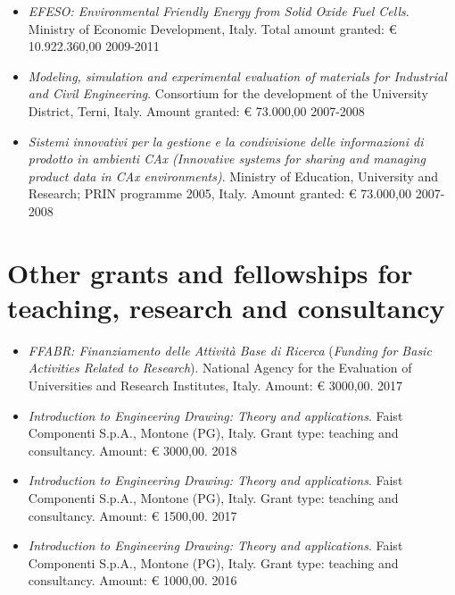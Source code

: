\documentclass[11pt]{article}
\begin{document}
\begin{itemize}
	\item \emph{EFESO: Environmental Friendly Energy from Solid Oxide Fuel Cells}. Ministry of Economic Development, Italy. Total amount granted: € 10.922.360,00 \hfill 2009-2011
	
	\item \emph{Modeling, simulation and experimental evaluation of materials for Industrial and Civil Engineering}. Consortium for the development of the University District, Terni, Italy. Amount granted: € 73.000,00 \hfill 2007-2008
	
	\item \emph{Sistemi innovativi per la gestione e la condivisione delle informazioni di prodotto in ambienti CAx (Innovative systems for sharing and managing product data in CAx environments)}. Ministry of Education, University and Research; PRIN programme 2005, Italy. Amount granted: € 73.000,00 \mbox{} \hfill 2007-2008

\end{itemize}

\section*{Other grants and fellowships for teaching, research and consultancy}

\begin{itemize}
	\item \emph{FFABR: Finanziamento delle Attività Base di Ricerca} (\emph{Funding for Basic Activities Related to Research}). National Agency 
for the Evaluation of Universities and Research Institutes, Italy. Amount: € 3000,00. \hfill 2017
\end{itemize}

\begin{itemize}
	\item \emph{Introduction to Engineering Drawing: Theory and applications}. Faist Componenti S.p.A., Montone (PG), Italy. Grant type: teaching and consultancy. Amount: € 3000,00. \hfill 2018
\end{itemize}

\begin{itemize}
	\item \emph{Introduction to Engineering Drawing: Theory and applications}. Faist Componenti S.p.A., Montone (PG), Italy. Grant type: teaching and consultancy. Amount: € 1500,00. \hfill 2017
\end{itemize}

\begin{itemize}
	\item \emph{Introduction to Engineering Drawing: Theory and applications}. Faist Componenti S.p.A., Montone (PG), Italy. Grant type: teaching and consultancy. Amount: € 1000,00. \hfill 2016
\end{itemize}
\end{document}
